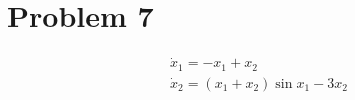 \section{Problem 7}



$$
\begin{array}{l}
\dot{x}_{1}=-x_{1}+x_{2} \\
\dot{x}_{2}=\left(x_{1}+x_{2}\right) \sin x_{1}-3 x_{2}
\end{array}
$$
